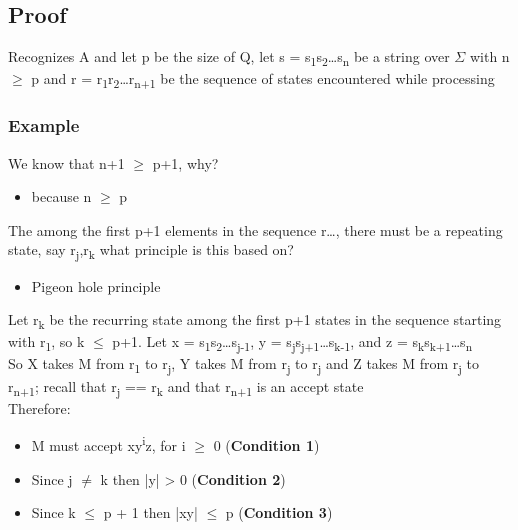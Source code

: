 \documentclass[11pt]{article}
\begin{document}
\subsection{Proof}
\label{sec:org1a48050}
Recognizes A and let p be the size of Q, let s = s\textsubscript{1}s\textsubscript{2}\ldots{}s\textsubscript{n} be a string over \(\Sigma\) with n \(\ge\) p and r = r\textsubscript{1}r\textsubscript{2}\ldots{}r\textsubscript{n+1} be the sequence of states encountered while processing\\
\subsubsection{Example}
\label{sec:org8e6460e}
We know that n+1 \(\ge\) p+1, why?\\
\begin{itemize}
\item because n \(\ge\) p\\
\end{itemize}

The among the first p+1 elements in the sequence r\ldots{}, there must be a repeating state, say r\textsubscript{j},r\textsubscript{k} what principle is this based on?\\
\begin{itemize}
\item Pigeon hole principle\\
\end{itemize}

Let r\textsubscript{k} be the recurring state among the first p+1 states in the sequence starting with r\textsubscript{1}, so k \(\le\) p+1. Let x = s\textsubscript{1}s\textsubscript{2}\ldots{}s\textsubscript{j-1}, y = s\textsubscript{j}s\textsubscript{j+1}\ldots{}s\textsubscript{k-1}, and z = s\textsubscript{k}s\textsubscript{k+1}\ldots{}s\textsubscript{n}\\

So X takes M from r\textsubscript{1} to r\textsubscript{j}, Y takes M from r\textsubscript{j} to r\textsubscript{j} and Z takes M from r\textsubscript{j} to r\textsubscript{n+1}; recall that r\textsubscript{j} == r\textsubscript{k} and that r\textsubscript{n+1} is an accept state\\
Therefore:\\
\begin{itemize}
\item M must accept xy\textsuperscript{i}z, for i \(\ge\) 0 (\textbf{Condition 1})\\
\item Since j \(\neq\) k then |y| \textgreater{} 0 (\textbf{Condition 2})\\
\item Since k \(\le\) p + 1 then |xy| \(\le\) p (\textbf{Condition 3})\\
\end{itemize}
\end{document}
